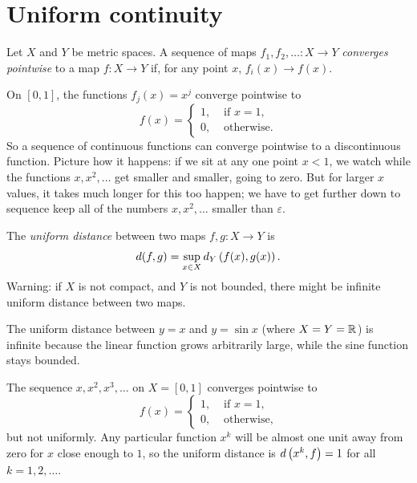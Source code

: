 \section{Uniform continuity}
Let \(X\) and \(Y\) be metric spaces.
A sequence of maps \(f_1, f_2, \dots \colon X \to Y\) \emph{converges pointwise} to a map \(f \colon X \to Y\) if, for any point \(x\), \(f_i(x) \to f(x)\).
\begin{exampleAndImage}{1.412cm}
On \([0,1]\), the functions \(f_j(x)=x^j\) converge pointwise to
\[
f(x)=
\begin{cases}
1, & \text{ if \(x=1\)}, \\
0, & \text{ otherwise}.
\end{cases}
\]
So a sequence of continuous functions can converge pointwise to a discontinuous function.
Picture how it happens: if we sit at any one point \(x < 1\), we watch while the functions \(x, x^2, \dots\) get smaller and smaller, going to zero.
But for larger \(x\) values, it takes  much longer for this too happen; we have to get further down to sequence keep all of the numbers \(x, x^2, \dots\) smaller than \(\varepsilon\).
\tcblower

\end{exampleAndImage}
The \emph{uniform distance} between two maps \(f,g \colon X \to Y\) is
\[
d(f,g)=\sup_{x \in X}d_Y\left(f(x),g(x)\right).
\]
Warning: if \(X\) is not compact, and \(Y\) is not bounded, there might be infinite uniform distance between two maps.
\begin{exampleAndImage}{2.415cm}
The uniform distance between \(y=x\) and \(y=\sin x\) (where \(X=Y=\mathbb{R}^{}\)) is infinite because the linear function grows arbitrarily large, while the sine function stays bounded.
\tcblower

\end{exampleAndImage}
\begin{exampleAndImage}{1.42cm}
The sequence \(x, x^2, x^3, \dots\) on \(X=[0,1]\) converges  pointwise  to
\[
f(x)=
\begin{cases}
1, & \text{ if \(x=1\)}, \\
0, & \text{ otherwise},
\end{cases}
\]
but not uniformly.
Any particular function \(x^k\) will be almost one unit away from zero for \(x\) close enough to \(1\), so the uniform distance is \(d\left(x^k,f\right)=1\) for all \(k=1,2,\dots\).
\tcblower

\end{exampleAndImage}
\begin{center}

\end{center}
